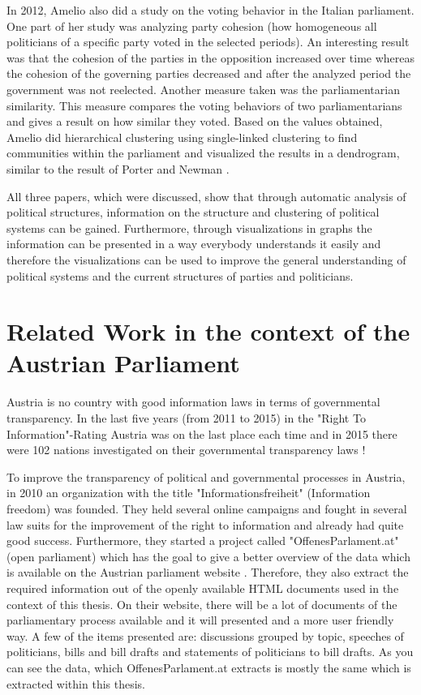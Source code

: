In 2012, Amelio \cite{Amelio_2012} also did a study on the voting behavior in the Italian parliament. One part of her study was analyzing party cohesion (how homogeneous all politicians of a specific party voted in the selected periods). An interesting result was that the cohesion of the parties in the opposition increased over time whereas the cohesion of the governing parties decreased and after the analyzed period the government was not reelected. Another measure taken was the parliamentarian similarity. This measure compares the voting behaviors of two parliamentarians and gives a result on how similar they voted. Based on the values obtained, Amelio did hierarchical clustering using single-linked clustering to find communities within the parliament and visualized the results in a dendrogram, similar to the result of Porter and Newman \cite{Porter_2005}. 

All three papers, which were discussed, show that through automatic analysis of political structures, information on the structure and clustering of political systems can be gained. Furthermore, through visualizations in graphs the information can be presented in a way everybody understands it easily and therefore the visualizations can be used to improve the general understanding of political systems and the current structures of parties and politicians.

\section{Related Work in the context of the Austrian Parliament}
Austria is no country with good information laws in terms of governmental transparency. In the last five years (from 2011 to 2015) in the "Right To Information"-Rating Austria was on the last place each time and in 2015 there were 102 nations investigated on their governmental transparency laws \cite{Informationsfreiheit_2015}!

To improve the transparency of political and governmental processes in Austria, in 2010 an organization with the title "Informationsfreiheit" (Information freedom) \cite{Informationsfreiheit_2015} was founded. They held several online campaigns and fought in several law suits for the improvement of the right to information and already had quite good success. Furthermore, they started a project called "OffenesParlament.at" (open parliament) \cite{OffenesParlament_2015} which has the goal to give a better overview of the data which is available on the Austrian parliament website \cite{AustrianParliament_2015}. Therefore, they also extract the required information out of the openly available HTML documents used in the context of this thesis. On their website, there will be a lot of documents of the parliamentary process available and it will presented and a more user friendly way. A few of the items presented are: discussions grouped by topic, speeches of politicians, bills and bill drafts and statements of politicians to bill drafts. As you can see the data, which OffenesParlament.at extracts is mostly the same which is extracted within this thesis.

